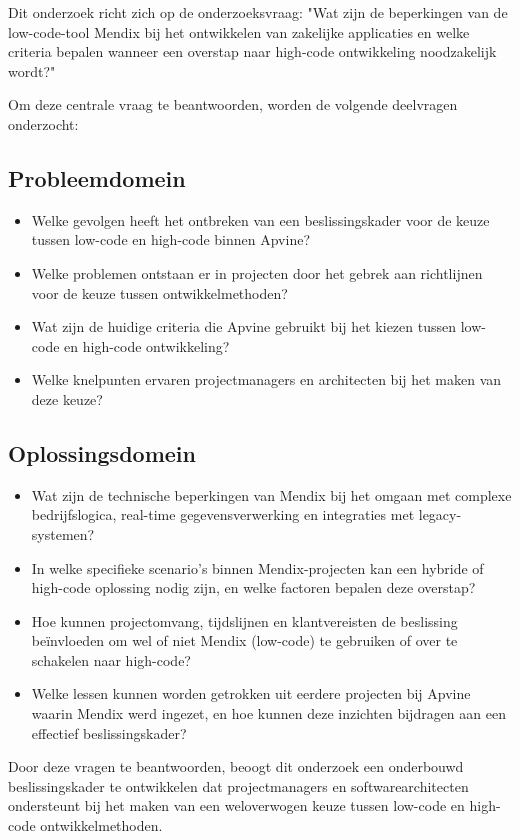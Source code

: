 Dit onderzoek richt zich op de onderzoeksvraag: "Wat zijn de beperkingen van de low-code-tool Mendix bij het ontwikkelen van zakelijke applicaties en welke criteria bepalen wanneer een overstap naar high-code ontwikkeling noodzakelijk wordt?" 

Om deze centrale vraag te beantwoorden, worden de volgende deelvragen onderzocht:  

\subsection{Probleemdomein}
\begin{itemize}
    \item Welke gevolgen heeft het ontbreken van een beslissingskader voor de keuze tussen low-code en high-code binnen Apvine?
    \item Welke problemen ontstaan er in projecten door het gebrek aan richtlijnen voor de keuze tussen ontwikkelmethoden?
    \item Wat zijn de huidige criteria die Apvine gebruikt bij het kiezen tussen low-code en high-code ontwikkeling?
    \item Welke knelpunten ervaren projectmanagers en architecten bij het maken van deze keuze?
\end{itemize}

\subsection{Oplossingsdomein}
\begin{itemize}
    \item Wat zijn de technische beperkingen van Mendix bij het omgaan met complexe bedrijfslogica, real-time gegevensverwerking en integraties met legacy-systemen?
    \item In welke specifieke scenario’s binnen Mendix-projecten kan een hybride of high-code oplossing nodig zijn, en welke factoren bepalen deze overstap?
    \item Hoe kunnen projectomvang, tijdslijnen en klantvereisten de beslissing beïnvloeden om wel of niet Mendix (low-code) te gebruiken of over te schakelen naar high-code?
    \item Welke lessen kunnen worden getrokken uit eerdere projecten bij Apvine waarin Mendix werd ingezet, en hoe kunnen deze inzichten bijdragen aan een effectief beslissingskader?
\end{itemize}

Door deze vragen te beantwoorden, beoogt dit onderzoek een onderbouwd beslissingskader te ontwikkelen dat projectmanagers en softwarearchitecten ondersteunt bij het maken van een weloverwogen keuze tussen low-code en high-code ontwikkelmethoden.

